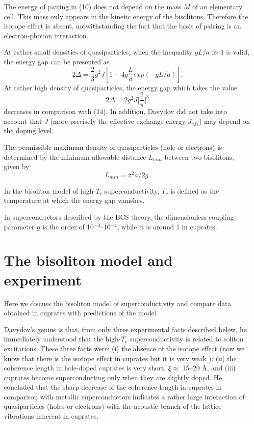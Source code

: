 The energy of pairing in (10) does not depend on the mass $M$ of an 
elementary cell. This mass only appears in the kinetic energy of the 
bisolitons. Therefore the isotope effect is absent, notwithstanding 
the fact that the basis of pairing is an electron-phonon interaction.

At rather small densities of quasiparticles, when the inequality 
$gL/a \gg 1$ is valid, the energy gap can be presented as
\begin{equation}
2\Delta = \frac{2}{3}g^{2}J[1+4g \frac{L}{a} exp(-gL/a)].
\end{equation}
At rather high density of quasiparticles, the energy gap which takes the 
value
\begin{equation}
2\Delta = 2g^{2}J\biggl[\frac{2}{\pi}\biggl]^{3}
\end{equation}
decreases in comparison with (14). In addition, Davydov did not take into 
account that $J$ (more precisely the effective exchange energy $J_{eff}$)
may depend on the doping level.

The permissible maximum density of quasiparticles (hole or electrons)
is determined by the minimum allowable distance $L_{min}$ between two 
bisolitons, given by
\begin{equation}
L_{min} = \pi^{2} a/2g. 
\end{equation}

In the bisoliton model of high-$T_{c}$ superconductivity, $T_{c}$ is 
defined as the temperature at which the energy gap vanishes. 

In superconductors described by the BCS theory, the dimensionless 
coupling parameter $g$ is the order of 10$^{-3}$--10$^{-4}$, while it is 
around 1 in cuprates. 

\section{The bisoliton model and experiment}

Here we discuss the bisoliton model of superconductivity and
compare data obtained in cuprates with predictions of the model. 

Davydov's genius is that, from only three experimental facts described 
below, he immediately understood that the high-$T_{c}$ superconductivity 
is related to soliton excitations. These three facts were: (i) 
the absence of the isotope effect (now we know that there is the isotope 
effect in cuprates but it is very weak \cite{Tallon}); (ii) the coherence 
length in hole-doped cuprates is very short, $\xi \approx$ 15--20 \AA, 
and (iii) cuprates become superconducting only when they are slightly 
doped. He concluded that the sharp decrease of the coherence length in 
cuprates in comparison with metallic superconductors indicates a rather 
large interaction of quasiparticles (holes or electrons) with the acoustic 
branch of the lattice vibrations inherent in cuprates.


